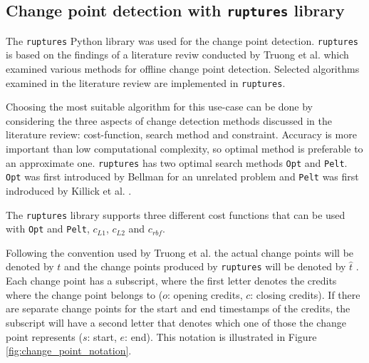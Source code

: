 \subsection{Change point detection with \texttt{ruptures} library} \label{subsec:solution}

The \texttt{ruptures} Python library was used for the change point detection. \texttt{ruptures} is based on the findings of a literature reviw conducted by Truong et al. \cite{truongSelectiveReviewOffline2020} which examined various methods for offline change point detection. Selected algorithms examined in the literature review are implemented in \texttt{ruptures}.

Choosing the most suitable algorithm %
for this use-case can be done by considering the three aspects of change detection methods discussed in the literature review: cost-function, search method and constraint. Accuracy is more important than low computational complexity, so optimal method is preferable to an approximate one. \texttt{ruptures} has two optimal search methods \texttt{Opt} and \texttt{Pelt}. %
\texttt{Opt} was first introduced by Bellman \cite{bellmanRoutingProblem1958} for an unrelated problem and \texttt{Pelt} was first indroduced by Killick et al. \cite{killickOptimalDetectionChangepoints2012}. 

The \texttt{ruptures} library supports three different cost functions that can be used with \texttt{Opt} and \texttt{Pelt}, $c_{L1}$, $c_{L2}$ and $c_{rbf}$.

Following the convention used by Truong et al. the actual change points will be denoted by $t$ and the change points produced by \texttt{ruptures} will be denoted by $\hat{t}$ \cite{truongSelectiveReviewOffline2020}. Each change point has a subscript, where the first letter denotes the credits where the change point belongs to ($o$: opening credits, $c$: closing credits). If there are separate change points for the start and end timestamps of the credits, the subscript will have a second letter that denotes which one of those the change point represents ($s$: start, $e$: end). This notation is illustrated in Figure \ref{fig:change_point_notation}.

